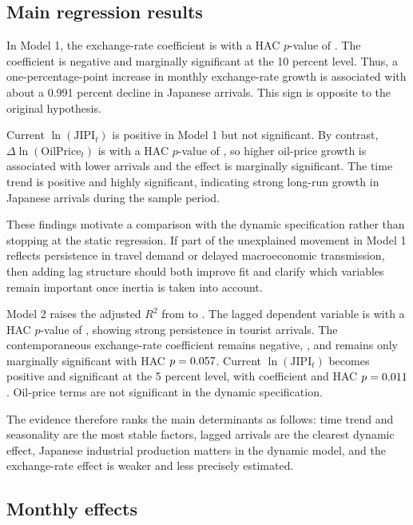 \documentclass[12pt]{article}
\begin{document}
\subsection{Main regression results}



In Model 1, the exchange-rate coefficient is \StaticFX{} with a HAC $p$-value of \StaticFXP{}. The coefficient is negative and marginally significant at the 10 percent level. Thus, a one-percentage-point increase in monthly exchange-rate growth is associated with about a 0.991 percent decline in Japanese arrivals. This sign is opposite to the original hypothesis.

Current $\ln(\mathrm{JIPI}_t)$ is positive in Model 1 but not significant. By contrast, $\Delta \ln(\mathrm{OilPrice}_t)$ is \StaticOil{} with a HAC $p$-value of \StaticOilP{}, so higher oil-price growth is associated with lower arrivals and the effect is marginally significant. The time trend is positive and highly significant, indicating strong long-run growth in Japanese arrivals during the sample period.

These findings motivate a comparison with the dynamic specification rather than stopping at the static regression. If part of the unexplained movement in Model 1 reflects persistence in travel demand or delayed macroeconomic transmission, then adding lag structure should both improve fit and clarify which variables remain important once inertia is taken into account.

Model 2 raises the adjusted $R^2$ from \StaticAdjRtwo{} to \DynamicAdjRtwo{}. The lagged dependent variable is \LagTourist{} with a HAC $p$-value of \LagTouristP{}, showing strong persistence in tourist arrivals. The contemporaneous exchange-rate coefficient remains negative, \DynamicFX{}, and remains only marginally significant with HAC $p=0.057$. Current $\ln(\mathrm{JIPI}_t)$ becomes positive and significant at the 5 percent level, with coefficient \DynamicJIPI{} and HAC $p=0.011$. Oil-price terms are not significant in the dynamic specification.

The evidence therefore ranks the main determinants as follows: time trend and seasonality are the most stable factors, lagged arrivals are the clearest dynamic effect, Japanese industrial production matters in the dynamic model, and the exchange-rate effect is weaker and less precisely estimated.

\subsection{Monthly effects}
\end{document}
